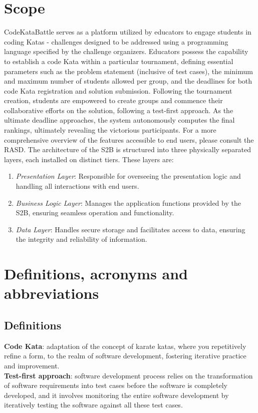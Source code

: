 \documentclass[12pt, a4paper]{report}
\begin{document}
    \section{Scope}
    CodeKataBattle serves as a platform utilized by educators to engage students in coding Katas - challenges designed to be addressed using a programming language specified by the challenge organizers. 
    Educators possess the capability to establish a code Kata within a particular tournament, defining essential parameters such as the problem statement (inclusive of test cases), 
    the minimum and maximum number of students allowed per group, and the deadlines for both code Kata registration and solution submission.
    Following the tournament creation, students are empowered to create groups and commence their collaborative efforts on the solution, following a test-first approach. 
    As the ultimate deadline approaches, the system autonomously computes the final rankings, ultimately revealing the victorious participants.
    For a more comprehensive overview of the features accessible to end users, please consult the RASD. 
    The architecture of the S2B is structured into three physically separated layers, each installed on distinct tiers. These layers are:
    \begin{enumerate}
        \item \textit{Presentation Layer}: Responsible for overseeing the presentation logic and handling all interactions with end users.
        \item \textit{Business Logic Layer}: Manages the application functions provided by the S2B, ensuring seamless operation and functionality.
        \item \textit{Data Layer}: Handles secure storage and facilitates access to data, ensuring the integrity and reliability of information.
    \end{enumerate}

    \section{Definitions, acronyms and abbreviations}
    \subsection{Definitions}
    \textbf{Code Kata}: adaptation of the concept of karate katas, where you repetitively refine a form, to the realm of software development, 
        fostering iterative practice and improvement. 
    \\
    \textbf{Test-first approach}:  software development process relies on the transformation of software requirements into test cases before 
        the software is completely developed, and it involves monitoring the entire software development by iteratively testing the software 
        against all these test cases.
\end{document}
